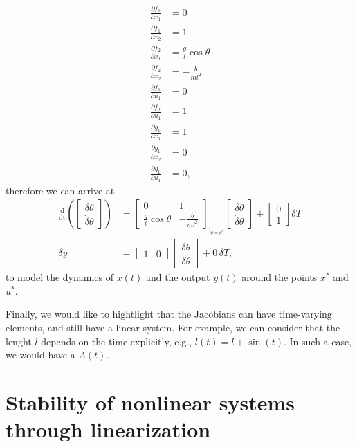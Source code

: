 \begin{align}
\frac{\partial f_1}{\partial x_1} &= 0 \nonumber \\
\frac{\partial f_1}{\partial x_2} &= 1 \nonumber \\
\frac{\partial f_2}{\partial x_1} &= \frac{g}{l}\cos\theta \nonumber \\
\frac{\partial f_2}{\partial x_2} &= -\frac{b}{ml^2} \nonumber \\
\frac{\partial f_1}{\partial u_1} &= 0 \nonumber \\
\frac{\partial f_2}{\partial u_1} &= 1 \nonumber \\
\frac{\partial g_1}{\partial x_1} &= 1 \nonumber \\
\frac{\partial g_1}{\partial x_2} &= 0 \nonumber \\
\frac{\partial g_1}{\partial u_1} &= 0, \nonumber
\end{align}
therefore we can arrive at
\begin{align}
	\frac{\mathrm{d}}{\mathrm{dt}}\left(\begin{bmatrix}\delta\theta \\ \dot\delta\theta \end{bmatrix}\right) &= \begin{bmatrix}0 & 1 \\ \frac{g}{l}\cos\theta & -\frac{b}{ml^2} \end{bmatrix}_{|_{\theta=\theta^*}} \begin{bmatrix}\delta\theta \\ \dot\delta\theta \end{bmatrix} + \begin{bmatrix}0 \\ 1 \end{bmatrix} \delta T \nonumber \\
		\delta y &= \begin{bmatrix}1 & 0\end{bmatrix}\begin{bmatrix}\delta\theta \\ \dot\delta\theta \end{bmatrix} + 0 \, \delta T,
\end{align}
to model the dynamics of $x(t)$ and the output $y(t)$ around the points $x^*$ and $u^*$.

Finally, we would like to hightlight that the Jacobians can have time-varying elements, and still have a linear system. For example, we can consider that the lenght $l$ depends on the time explicitly, e.g., $l(t) = l + \sin(t)$. In such a case, we would have a $A(t)$.

\section{Stability of nonlinear systems through linearization}
